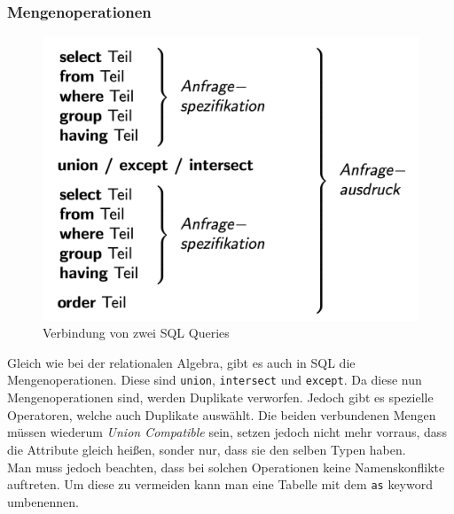 \documentclass{article}
\begin{document}
 	\subsubsection{Mengenoperationen}
 	\begin{figure}[H]
 	\centering
  \includegraphics[scale=0.3]{Bilder/sql_union.png}
 	\caption{Verbindung von zwei SQL Queries}
 	\end{figure}
 	Gleich wie bei der relationalen Algebra, gibt es auch in SQL die Mengenoperationen. Diese sind \verb|union|, \verb|intersect| und \verb|except|. Da diese nun Mengenoperationen sind, werden Duplikate verworfen. Jedoch gibt es spezielle Operatoren, welche auch Duplikate auswählt. Die beiden verbundenen Mengen müssen wiederum \textit{Union Compatible} sein, setzen jedoch nicht mehr vorraus, dass die Attribute gleich heißen, sonder nur, dass sie den selben Typen haben. \\
 	Man muss jedoch beachten, dass bei solchen Operationen keine Namenskonflikte auftreten. Um diese zu vermeiden kann man eine Tabelle mit dem \verb|as| keyword umbenennen.
\end{document}
